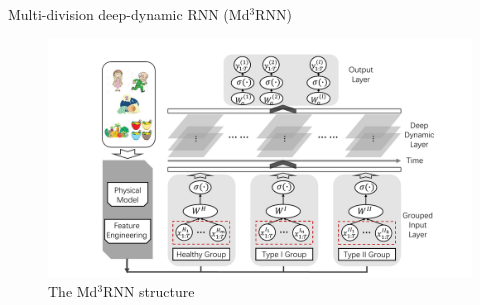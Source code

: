 
Multi-division deep-dynamic RNN (Md$^3$RNN)

\begin{figure}[!t]
  \centering
  \includegraphics[width=0.9\columnwidth]{./img/pics_RNN.pdf}
  \caption{The Md$^3$RNN structure}
  \label{fig:rnn}
\end{figure}
